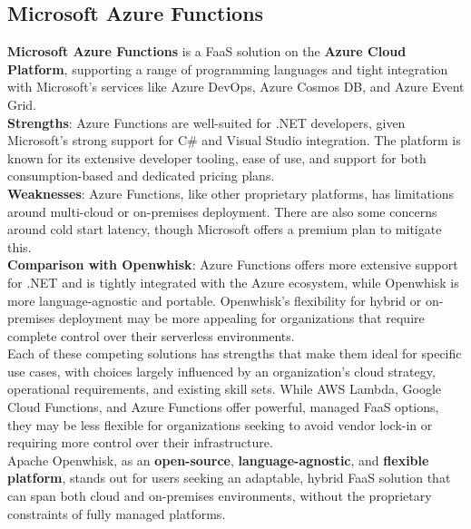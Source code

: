 \subsection{Microsoft Azure Functions}
\textbf{Microsoft Azure Functions} is a FaaS solution on the \textbf{Azure Cloud Platform}, supporting a range of programming languages and tight integration with Microsoft’s services like Azure DevOps, Azure Cosmos DB, and Azure Event Grid.\vspace{14pt}\\
\textbf{Strengths}: Azure Functions are well-suited for .NET developers, given Microsoft’s strong support for C\# and Visual Studio integration. The platform is known for its extensive developer tooling, ease of use, and support for both consumption-based and dedicated pricing plans.\vspace{14pt}\\
\textbf{Weaknesses}: Azure Functions, like other proprietary platforms, has limitations around multi-cloud or on-premises deployment. There are also some concerns around cold start latency, though Microsoft offers a premium plan to mitigate this.\vspace{14pt}\\
\textbf{Comparison with Openwhisk}: Azure Functions offers more extensive support for .NET and is tightly integrated with the Azure ecosystem, while Openwhisk is more language-agnostic and portable. Openwhisk’s flexibility for hybrid or on-premises deployment may be more appealing for organizations that require complete control over their serverless environments.\vspace{20pt}\\
Each of these competing solutions has strengths that make them ideal for specific use cases, with choices largely influenced by an organization’s cloud strategy, operational requirements, and existing skill sets. While AWS Lambda, Google Cloud Functions, and Azure Functions offer powerful, managed FaaS options, they may be less flexible for organizations seeking to avoid vendor lock-in or requiring more control over their infrastructure.\vspace{14pt}\\
Apache Openwhisk, as an \textbf{open-source}, \textbf{language-agnostic}, and \textbf{flexible platform}, stands out for users seeking an adaptable, hybrid FaaS solution that can span both cloud and on-premises environments, without the proprietary constraints of fully managed platforms.
